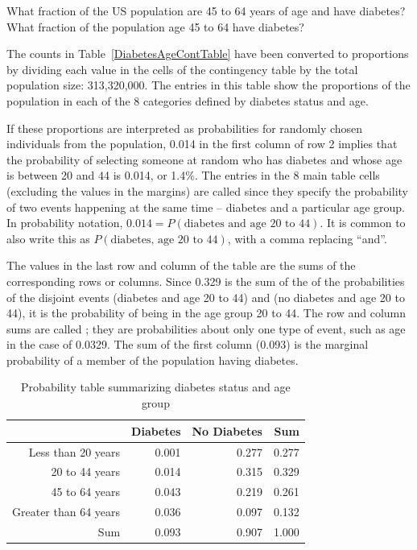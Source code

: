 \begin{doublespace}
\begin{exercise} \label{DiabetesAge20to44}

What fraction of the US population are 45 to 64 years of age and have diabetes?  What fraction of the population age 45 to 64 have diabetes?

\end{exercise}

The counts in Table~\ref{DiabetesAgeContTable} have been converted to proportions by dividing each value in the cells of the contingency table by the total population size: 313,320,000. The entries in this table show the proportions of the population in each of the 8 categories defined by diabetes status and age. 

If these proportions are interpreted as probabilities for randomly chosen individuals from the population, 0.014 in the first column of row 2 implies that the probability of selecting someone at random who has diabetes and whose age is between 20 and 44 is 0.014, or 1.4\%. The entries in the 8 main table cells (excluding the values in the margins) are called  since they specify the probability of two events happening at the same time -- diabetes and a particular age group. In probability notation, $0.014 = P(\text{diabetes and age 20 to 44})$. It is common to also write this as $P(\text{diabetes, age 20 to 44})$, with a comma replacing ``and''.

The values in the last row and column of the table are the sums of the corresponding rows or columns. Since 0.329 is the sum of the of the probabilities of the disjoint events (diabetes and age 20 to 44) and (no diabetes and age 20 to 44), it is the probability of being in the age group 20 to 44. The row and column sums are called ; they are probabilities about only one type of event, such as age in the case of 0.0329. The sum of the first column (0.093) is the marginal probability of a member of the population having diabetes.


\begin{table}[ht]
\centering
\begin{tabular}{rrrr}
  \hline
 & Diabetes & No Diabetes & Sum \\ 
  \hline
Less than 20 years & 0.001 & 0.277 & 0.277 \\ 
  20 to 44 years & 0.014 & 0.315 & 0.329 \\ 
  45 to 64 years & 0.043 & 0.219 & 0.261 \\ 
  Greater than 64 years & 0.036 & 0.097 & 0.132 \\ 
  Sum & 0.093 & 0.907 & 1.000 \\ 
   \hline
\end{tabular}
\caption{Probability table summarizing diabetes status and age group}
\label{DiabetesAgeProbTable}
\end{table}



\end{doublespace}
